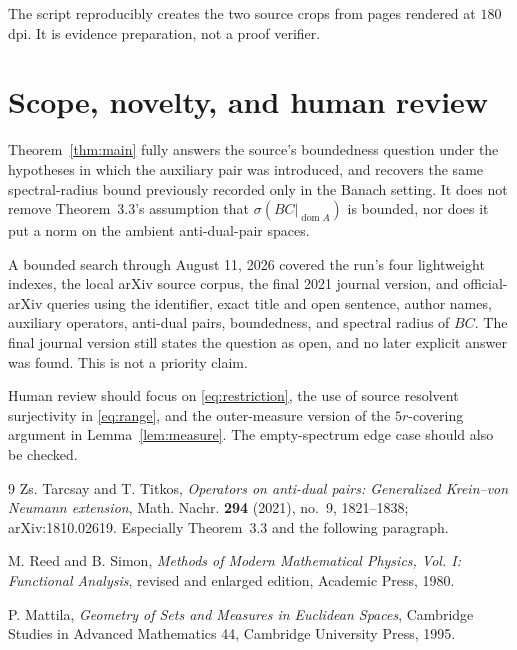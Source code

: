 \documentclass[11pt]{article}
\newcommand{\domA}{\operatorname{dom}A}
\begin{document}
The script  reproducibly creates the two source
crops from pages rendered at \(180\) dpi.  It is evidence preparation, not a
proof verifier.

\section*{Scope, novelty, and human review}

Theorem~\ref{thm:main} fully answers the source's boundedness question under
the hypotheses in which the auxiliary pair was introduced, and recovers the
same spectral-radius bound previously recorded only in the Banach setting.  It
does not remove Theorem~3.3's assumption that
\(\sigma(BC|_{\domA})\) is bounded, nor does it put a norm on the ambient
anti-dual-pair spaces.

A bounded search through August 11, 2026 covered the run's four lightweight
indexes, the local arXiv source corpus, the final 2021 journal version, and
official-arXiv queries using the identifier, exact title and open sentence,
author names, auxiliary operators, anti-dual pairs, boundedness, and spectral
radius of \(BC\).  The final journal version still states the question as
open, and no later explicit answer was found.  This is not a priority claim.

Human review should focus on \eqref{eq:restriction}, the use of source
resolvent surjectivity in \eqref{eq:range}, and the outer-measure version of
the \(5r\)-covering argument in Lemma~\ref{lem:measure}.  The empty-spectrum
edge case should also be checked.

\begin{thebibliography}{9}
Zs. Tarcsay and T. Titkos,
\emph{Operators on anti-dual pairs: Generalized Krein--von Neumann extension},
Math. Nachr. \textbf{294} (2021), no.~9, 1821--1838;
arXiv:1810.02619.  Especially Theorem~3.3 and the following paragraph.

M. Reed and B. Simon,
\emph{Methods of Modern Mathematical Physics, Vol. I: Functional Analysis},
revised and enlarged edition, Academic Press, 1980.

P. Mattila,
\emph{Geometry of Sets and Measures in Euclidean Spaces},
Cambridge Studies in Advanced Mathematics 44, Cambridge University Press,
1995.
\end{thebibliography}
\end{document}
